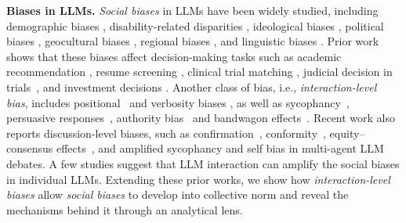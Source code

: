 \documentclass{article}
\theoremstyle{plain}
\theoremstyle{definition}
\theoremstyle{remark}
\begin{document}
\textbf{Biases in LLMs. }
\textsl{Social biases} in LLMs have been widely studied, including demographic biases \cite{liu-etal-2024-confronting,ferrara2023,sorokovikova-etal-2025-surface}, disability-related disparities \cite{panda-etal-2025-accesseval}, ideological biases \cite{buyl2024ideology}, political biases \cite{santurkar2023,rozado2024political}, geocultural biases \cite{tao2024cultural}, regional biases \cite{manvi2024geographical,dudy2025unequal}, and linguistic biases \cite{smith2024standard}. 
Prior work shows that these biases affect decision-making tasks such as academic recommendation \cite{sorokovikova-etal-2025-surface}, resume screening \cite{wang-etal-2024-jobfair,wilson2025gender,armstrong2024}, clinical trial matching \cite{ji2025mitigating},  judicial decision in trials~\cite{hofmann2024ai}, and investment decisions \cite{winder2025biased}. 
Another class of bias, i.e., {\sl interaction-level bias}, includes positional~\cite{wang-etal-2024-large-language-models-fair} and verbosity biases \cite{koo-etal-2024-benchmarking,saito2023verbosity}, as well as sycophancy~\cite{zheng2023judging}, persuasive responses~\cite{stengel-eskin-etal-2025-teaching}, authority bias~\cite{ye2024justice} and bandwagon effects~\cite{koo-etal-2024-benchmarking}. 
Recent work also reports discussion-level biases, such as confirmation~\cite{chuang-etal-2024-simulating}, conformity~\cite{chen2023agentverse,choi2025empirical}, equity–consensus effects~\cite{cisneros-velarde-2025-biases}, and amplified sycophancy and self bias \cite{choi2025measuring} in multi-agent LLM debates. 
A few studies \cite{borah-mihalcea-2024-towards,oh2025understanding,guo2025your} suggest that LLM interaction can amplify the social biases in individual LLMs. 
Extending these prior works, we show how {\sl interaction-level biases} allow {\sl social biases} to develop into collective norm and reveal the mechanisms behind it through an analytical lens. 
\end{document}
